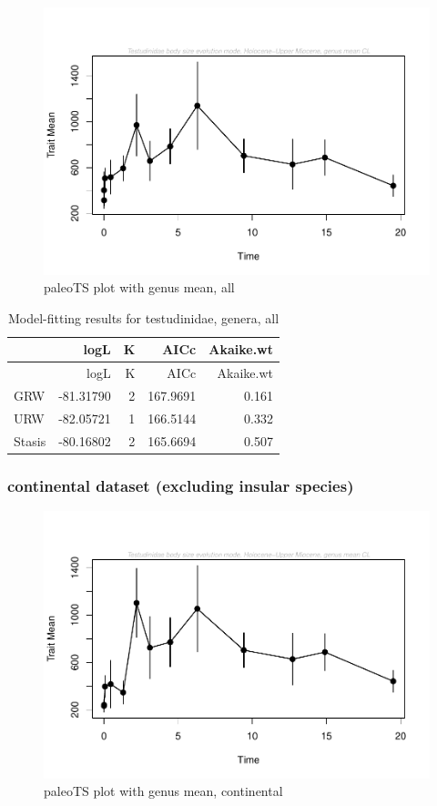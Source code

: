 \begin{figure}[H]
	\centering
	\includegraphics{MA_JJ_files/figure-latex/paleoTSAll-1.pdf}
	\caption{paleoTS plot with genus mean, all}
	\label{fig:pTSall}
\end{figure}

\begin{longtable}[]{@{}lrrrr@{}}
	\caption{Model-fitting results for testudinidae, genera,
		all}
	\label{tab:pTSallEM}\tabularnewline
	\toprule
	& logL & K & AICc & Akaike.wt\tabularnewline
	\midrule
	\endfirsthead
	\toprule
	& logL & K & AICc & Akaike.wt\tabularnewline
	\midrule
	\endhead
	GRW & -81.31790 & 2 & 167.9691 & 0.161\tabularnewline
	URW & -82.05721 & 1 & 166.5144 & 0.332\tabularnewline
	Stasis & -80.16802 & 2 & 165.6694 & 0.507\tabularnewline
	\bottomrule
\end{longtable}

\FloatBarrier

\subsubsection{continental dataset (excluding insular
	species)}\label{continental-excluding-insular-species}


\begin{figure}[H]
	\centering
	\includegraphics{MA_JJ_files/figure-latex/paleoTSC-1.pdf}
	\caption{paleoTS plot with genus mean, continental}
	\label{fig:pTSC}
\end{figure}

